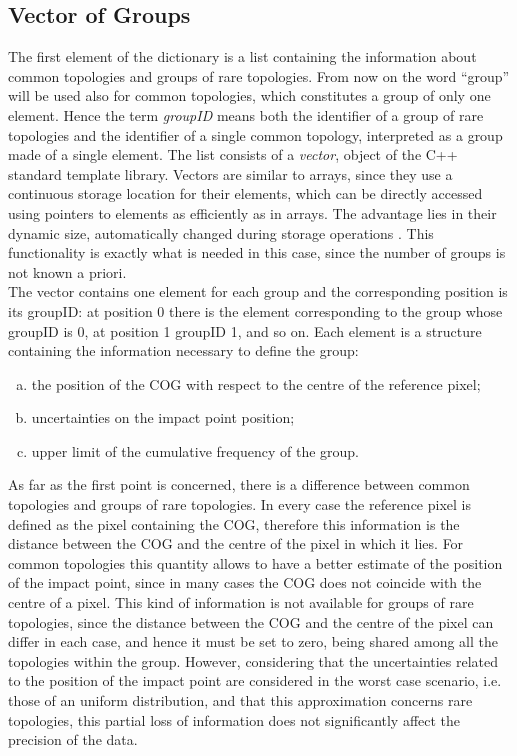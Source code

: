 \subsection{Vector of Groups}
The first element of the dictionary is a list containing the information about common topologies and groups of rare topologies. From now on the word ``group'' will be used also for common topologies, which constitutes a group of only one element. Hence the term \textit{groupID} means both the identifier of a group of rare topologies and the identifier of a single common topology, interpreted as a group made of a single element. The list consists of a \textit{vector}, object of the C++ standard template library. Vectors are similar to arrays, since they use a continuous storage location for their elements, which can be directly accessed using pointers to elements as efficiently as in arrays. The advantage lies in their dynamic size, automatically changed during storage operations \cite{vector}. This functionality is exactly what is needed in this case, since the number of groups is not known a priori.\\
The vector contains one element for each group and the corresponding position is its groupID: at position 0 there is the element corresponding to the group whose groupID is 0, at position 1 groupID 1, and so on. Each element is a structure containing the information necessary to define the group:
\begin{enumerate}[a)]
 \item the position of the COG with respect to the centre of the reference pixel;
 \item uncertainties on the impact point position;
 \item upper limit of the cumulative frequency of the group.
\end{enumerate}
As far as the first point is concerned, there is a difference between common topologies and groups of rare topologies. In every case the reference pixel is defined as the pixel containing the COG, therefore this information is the distance between the COG and the centre of the pixel in which it lies. For common topologies this quantity allows to have a better estimate of the position of the impact point, since in many cases the COG does not coincide with the centre of a pixel. This kind of information is not available for groups of rare topologies, since the distance between the COG and the centre of the pixel can differ in each case, and hence it must be set to zero, being shared among all the topologies within the group. However, considering that the uncertainties related to the position of the impact point are considered in the worst case scenario, i.e. those of an uniform distribution, and that this approximation concerns rare topologies, this partial loss of information does not significantly affect the precision of the data.\\
